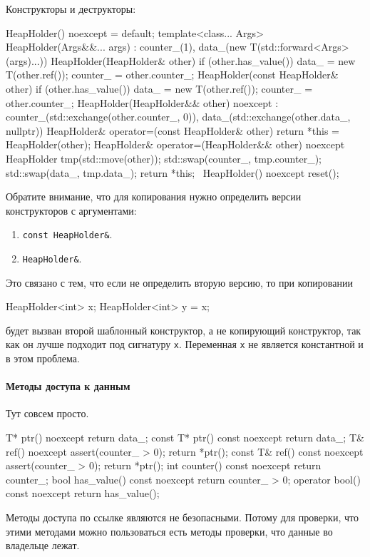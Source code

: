 Конструкторы и деструкторы:
\begin{cppcode}
HeapHolder() noexcept = default;
template<class... Args>
HeapHolder(Args&&... args)
    : counter_(1), data_(new T(std::forward<Args>(args)...)) {
}
HeapHolder(HeapHolder& other) {
  if (other.has_value()) {
    data_ = new T(other.ref());
    counter_ = other.counter_;
  }
}
HeapHolder(const HeapHolder& other) {
  if (other.has_value()) {
    data_ = new T(other.ref());
    counter_ = other.counter_;
  }
}
HeapHolder(HeapHolder&& other) noexcept
    : counter_(std::exchange(other.counter_, 0)),
      data_(std::exchange(other.data_, nullptr)) {
}
HeapHolder& operator=(const HeapHolder& other) {
  return *this = HeapHolder(other);
}
HeapHolder& operator=(HeapHolder&& other) noexcept {
  HeapHolder tmp(std::move(other));
  std::swap(counter_, tmp.counter_);
  std::swap(data_, tmp.data_);
  return *this;
}
~HeapHolder() noexcept {
  reset();
}
\end{cppcode}
Обратите внимание, что для копирования нужно определить версии конструкторов с аргументами:
\begin{enumerate}
\item \verb"const HeapHolder&".

\item \verb"HeapHolder&".
\end{enumerate}
Это связано с тем, что если не определить вторую версию, то при копировании
\begin{cppcode}
HeapHolder<int> x;
HeapHolder<int> y = x;
\end{cppcode}
будет вызван второй шаблонный конструктор, а не копирующий конструктор, так как он лучше подходит под сигнатуру \verb"x".
Переменная \verb"x" не является константной и в этом проблема.

\paragraph{Методы доступа к данным}

Тут совсем просто.
\begin{cppcode}
T* ptr() noexcept {
  return data_;
}
const T* ptr() const noexcept {
  return data_;
}
T& ref() noexcept {
  assert(counter_ > 0);
  return *ptr();
}
const T& ref() const noexcept {
  assert(counter_ > 0);
  return *ptr();
}
int counter() const noexcept {
  return counter_;
}
bool has_value() const noexcept {
  return counter_ > 0;
}
operator bool() const noexcept {
  return has_value();
}
\end{cppcode}
Методы доступа по ссылке являются не безопасными.
Потому для проверки, что этими методами можно пользоваться есть методы проверки, что данные во владельце лежат.

